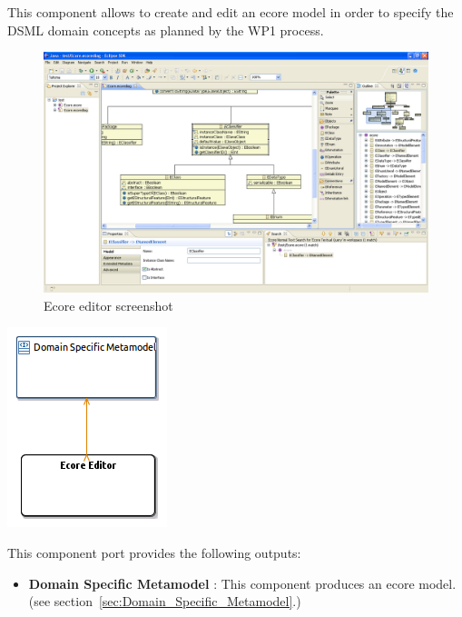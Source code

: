 \documentclass{gemoc} %
\begin{document}
This component allows to create and edit an ecore model in order to specify the DSML domain concepts as planned by the WP1 process.
\begin{figure}[h]
	\begin{center}
	\includegraphics*[trim=0.0cm 0.0cm 0cm 0.0cm, clip=true, width=1.0\linewidth]{../images/EcoreDiagramOverview.png}
	\caption{Ecore editor screenshot}
	\end{center}
\end{figure}
\begin{center}
\includegraphics*[trim=0.0cm 0.0cm 0cm 0.0cm, clip=true]{../images/generated/Generated_Ecore_Editor.png}
\end{center}


This component port provides the following outputs:
\begin{itemize}
  \item \textbf{Domain Specific Metamodel} :
This component produces an ecore model.
(see section~\ref{sec:Domain_Specific_Metamodel}.)
\end{itemize}
\end{document}
